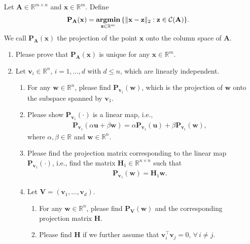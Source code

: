\documentclass[11pt,letter,notitlepage]{article}
\DeclareMathOperator*{\argmin}{\bf argmin}
\newcommand{\proj}[2]{\textbf{P}_{#2} (#1)}
\theoremstyle{definition}
\begin{document}
	
	\begin{exercise}[Projection ]
		Let $\mathbf{A}\in\mathbb{R}^{m\times n}$ and $\mathbf{x} \in \mathbb{R}^m$. Define
		\begin{align*}
			\proj{\mathbf{x}}{\mathbf{A}} = \argmin_{\mathbf{z}\in\mathbb{R}^m}\,\{\|\mathbf{x}-\mathbf{z}\|_2: \mathbf{z}\in\mathcal{C}(\mathbf{A})\}.   
		\end{align*}
		We call $\proj{\mathbf{x}}{\mathbf{A}}$ the projection of the point $\mathbf{x}$ onto the column space of $\mathbf{A}$. 
		\begin{enumerate}
			\item Please prove that $\mathbf{P}_{\mathbf{A}}(\mathbf{x})$ is unique for any $\mathbf{x} \in \mathbb{R}^m$. 
			\item Let $\mathbf{v}_i \in \mathbb{R}^n$, $i=1,\ldots,d$ with $d\leq n$, which are linearly independent.
			\begin{enumerate}
				\item For any $\mathbf{w}\in \mathbb{R}^n$, please find $\proj{\mathbf{w}}{\mathbf{v}_1}$, which is the projection of $\mathbf{w}$ onto the subspace spanned by $\mathbf{v}_1$.  
				\item Please show $\proj{\cdot}{\mathbf{v}_1}$ is a linear map, i.e.,
				\begin{align*}
					\proj{\alpha\mathbf{u}+\beta\mathbf{w}}{\mathbf{v}_1}=\alpha\proj{\mathbf{u}}{\mathbf{v}_1} + \beta \proj{\mathbf{w}}{\mathbf{v}_1},
				\end{align*}
				where $\alpha,\beta\in\mathbb{R}$ and $\mathbf{w}\in\mathbb{R}^n$.
				\item Please find the projection matrix corresponding to the linear map $\proj{\cdot}{\mathbf{v}_1}$, i.e., find the matrix $\mathbf{H}_1\in\mathbb{R}^{n\times n}$ such that
				\begin{align*}
					\proj{\mathbf{w}}{\mathbf{v}_1}=\mathbf{H}_1\mathbf{w}.
				\end{align*}
				\item Let $\mathbf{V}=(\mathbf{v}_1,\ldots,\mathbf{v}_d)$. 
				\begin{enumerate}
					\item For any $\mathbf{w}\in \mathbb{R}^n$, please find $\proj{\mathbf{w}}{\mathbf{V}}$ and the corresponding projection matrix $\mathbf{H}$.
					\item Please find $\mathbf{H}$ if we further assume that $\mathbf{v}_i^{\top}\mathbf{v}_j=0$, $\forall\,i\neq j$.
				\end{enumerate}
			\end{enumerate}
			

\end{enumerate}
\end{exercise}
\end{document}
